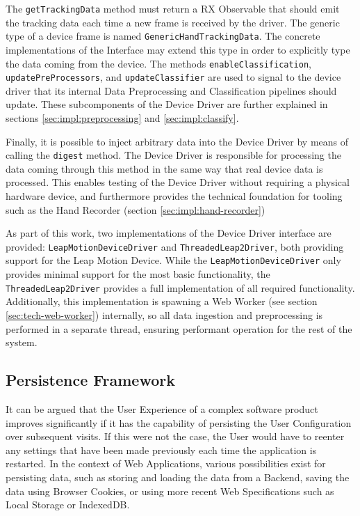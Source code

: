 The \texttt{getTrackingData} method must return a \gls{RX} Observable that should emit the tracking data each time a new frame is received by the driver. The generic type of a device frame is named \texttt{GenericHandTrackingData}. The concrete implementations of the Interface may extend this type in order to explicitly type the data coming from the device. The methods \texttt{enableClassification}, \texttt{updatePreProcessors}, and \texttt{updateClassifier} are used to signal to the device driver that its internal Data Preprocessing and Classification pipelines should update. These subcomponents of the Device Driver are further explained in sections \ref{sec:impl:preprocessing} and \ref{sec:impl:classify}.

Finally, it is possible to inject arbitrary data into the Device Driver by means of calling the \texttt{digest} method. The Device Driver is responsible for processing the data coming through this method in the same way that real device data is processed. This enables testing of the Device Driver without requiring a physical hardware device, and furthermore provides the technical foundation for tooling such as the Hand Recorder (section \ref{sec:impl:hand-recorder})

As part of this work, two implementations of the Device Driver interface are provided: \texttt{LeapMotionDeviceDriver} and \texttt{ThreadedLeap2Driver}, both providing support for the Leap Motion Device. While the \texttt{LeapMotionDeviceDriver} only provides minimal support for the most basic functionality, the \texttt{ThreadedLeap2Driver} provides a full implementation of all required functionality. Additionally, this implementation is spawning a Web Worker (see section \ref{sec:tech-web-worker}) internally, so all data ingestion and preprocessing is performed in a separate thread, ensuring performant operation for the rest of the system.

\subsection{Persistence Framework}
\label{sec:impl:persist}
It can be argued that the User Experience of a complex software product improves significantly if it has the capability of persisting the User Configuration over subsequent visits. If this were not the case, the User would have to reenter any settings that have been made previously each time the application is restarted. In the context of Web Applications, various possibilities exist for persisting data, such as storing and loading the data from a Backend, saving the data using Browser Cookies, or using more recent Web Specifications such as Local Storage or IndexedDB.

